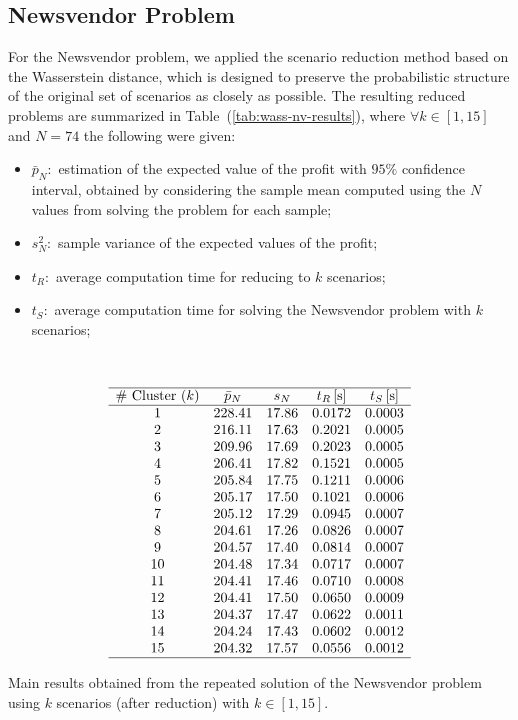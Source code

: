\documentclass[a4paper,12pt]{article}
\begin{document}
	\subsection{Newsvendor Problem}
	
	For the Newsvendor problem, we applied the scenario reduction method based on the Wasserstein distance, which is designed to preserve the probabilistic structure of the original set of scenarios as closely as possible. The resulting reduced problems are summarized in Table~(\ref{tab:wass-nv-results}), where $\forall k \in [1,15]$ and $N = 74$ the following were given:
	\begin{itemize}
		\item $\bar{p}_{N}:$ estimation of the expected value of the profit with $95\%$ confidence interval, obtained by considering the sample mean computed using the $N$ values from solving the problem for each sample; 
		\item $s^{2}_{N}:$ sample variance of the expected values of the profit;
		\item $t_{R}:$ average computation time for reducing to $k$ scenarios;
		\item $t_{S}:$ average computation time for solving the Newsvendor problem with $k$ scenarios;
	\end{itemize}~
	
	\begin{table}[H]
	\[
	\begin{array}{ccccc}
		\hline
		\text{\# Cluster $(k)$} & \text{$\bar{p}_{N}$} & \text{$s_{N}$} & \text{$t_{R}$\,[s]} & \text{$t_{S}$\,[s]} \\
		\hline
		1 & 228.41 & 17.86 & 0.0172 & 0.0003 \\
		2 & 216.11 & 17.63 & 0.2021 & 0.0005 \\
		3 & 209.96 & 17.69 & 0.2023 & 0.0005 \\
		4 & 206.41 & 17.82 & 0.1521 & 0.0005 \\
		5 & 205.84 & 17.75 & 0.1211 & 0.0006 \\
		6 & 205.17 & 17.50 & 0.1021 & 0.0006 \\
		7 & 205.12 & 17.29 & 0.0945 & 0.0007 \\
		8 & 204.61 & 17.26 & 0.0826 & 0.0007 \\
		9 & 204.57 & 17.40 & 0.0814 & 0.0007 \\
		10 & 204.48 & 17.34 & 0.0717 & 0.0007 \\
		11 & 204.41 & 17.46 & 0.0710 & 0.0008 \\
		12 & 204.41 & 17.50 & 0.0650 & 0.0009 \\
		13 & 204.37 & 17.47 & 0.0622 & 0.0011 \\
		14 & 204.24 & 17.43 & 0.0602 & 0.0012 \\
		15 & 204.32 & 17.57 & 0.0556 & 0.0012 \\
		\hline
	\end{array}
	\]
	\caption{Main results obtained from the repeated solution of the Newsvendor problem using $k$ scenarios (after reduction) with $k \in [1,15]$.}
	\label{tab:wass-nv-results}
	\end{table}
	
\end{document}
